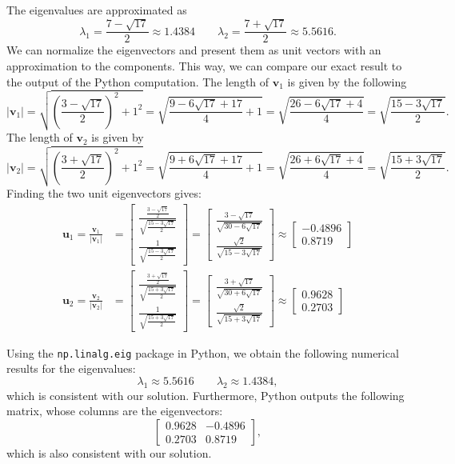 \documentclass[]{exam}
\numberwithin{equation}{section}
\begin{document}
\begin{questions}
\begin{parts}
The eigenvalues are approximated as 
\[ \lambda_{1} = \frac{7 - \sqrt{17}}{2} \approx 1.4384  \qquad \lambda_2 = \frac{7 + \sqrt{17}}{2} \approx 5.5616. \]
We can normalize the eigenvectors and present them as unit vectors with an approximation to the components.  This way, we can compare our exact result to the output of the Python computation.  The length of $\boldsymbol{v}_1$ is given by the following 
\[ |\boldsymbol{v}_{1}| = \sqrt{\left( \frac{3-\sqrt{17}}{2}\right)^2 + 1^2} = \sqrt{\frac{9 - 6\sqrt{17} + 17}{4} + 1} =  \sqrt{\frac{26 - 6\sqrt{17} + 4}{4} }  = \sqrt{\frac{15 - 3\sqrt{17}}{2}}.\]
The length of $\boldsymbol{v}_2$ is given by 
\[ |\boldsymbol{v}_{2}| = \sqrt{\left( \frac{3+\sqrt{17}}{2}\right)^2 + 1^2} = \sqrt{\frac{9 + 6\sqrt{17} + 17}{4} + 1} = \sqrt{\frac{26 + 6\sqrt{17} + 4}{4} } = \sqrt{\frac{15 + 3\sqrt{17}}{2}}.\]
Finding the two unit eigenvectors gives: 
\begin{align*}
	\boldsymbol{u}_1 = \frac{\boldsymbol{v}_1}{|\boldsymbol{v}_1|} & = \begin{bmatrix} \frac{\frac{3- \sqrt{17}}{2}}{\sqrt{\frac{15 - 3\sqrt{17}}{2}}} \\ \frac{1}{\sqrt{\frac{15 - 3\sqrt{17}}{2}}} \end{bmatrix}  = \begin{bmatrix} \frac{3 - \sqrt{17}}{\sqrt{30-6\sqrt{17}}} \\ \frac{\sqrt{2}}{\sqrt{15 - 3\sqrt{17}}} \end{bmatrix} \approx \begin{bmatrix} -0.4896 \\ 0.8719 \end{bmatrix} \\ 
	\boldsymbol{u}_2 = \frac{\boldsymbol{v}_2}{|\boldsymbol{v}_2|} & = \begin{bmatrix} \frac{\frac{3+\sqrt{17}}{2}}{\sqrt{\frac{15 + 3\sqrt{17}}{2}}} \\ \frac{1}{\sqrt{\frac{15 + 3\sqrt{17}}{2}}} \end{bmatrix}  = \begin{bmatrix} \frac{3 + \sqrt{17}}{\sqrt{30+6\sqrt{17}}} \\ \frac{\sqrt{2}}{\sqrt{15 + 3\sqrt{17}}} \end{bmatrix} \approx \begin{bmatrix} 0.9628 \\ 0.2703\end{bmatrix} \end{align*}

Using the \texttt{np.linalg.eig} package in Python, we obtain the following numerical results for the eigenvalues: 
\[ \lambda_{1} \approx 5.5616 \qquad \lambda_2  \approx 1.4384,\]
which is consistent with our solution.  Furthermore, Python outputs the following matrix, whose columns are the eigenvectors: 
\[ \begin{bmatrix}0.9628 & -0.4896\\ 0.2703 & 0.8719  \end{bmatrix}, \]
which is also consistent with our solution.



\end{parts}
\end{questions}
\end{document}
